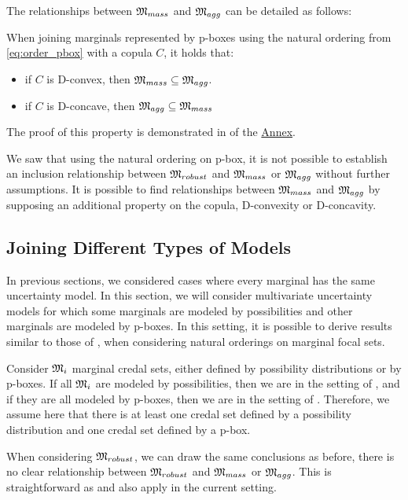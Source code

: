 The relationships between $\mathfrak{M}_{mass}$ and $\mathfrak{M}_{agg}$ can be detailed as follows:
\begin{proposition}\label{prop:convexity_pbox}
    When joining marginals represented by p-boxes using the natural ordering from \eqref{eq:order_pbox} with a copula $C$, it holds that:
    \begin{itemize}
        \item if $C$ is D-convex, then $\mathfrak{M}_{mass}\subseteq \mathfrak{M}_{agg}$.
        \item if $C$ is D-concave, then $\mathfrak{M}_{agg}\subseteq\mathfrak{M}_{mass}$ 
    \end{itemize}
\end{proposition}
The proof of this property is demonstrated in  of the \hyperref[chap:annex]{Annex}.

We saw that using the natural ordering on p-box, it is not possible to establish an inclusion relationship between $\mathfrak{M}_{robust}$ and $\mathfrak{M}_{mass}$ or $\mathfrak{M}_{agg}$ without further assumptions. It is possible to find relationships between $\mathfrak{M}_{mass}$ and $\mathfrak{M}_{agg}$ by supposing an additional property on the copula, \ie D-convexity or D-concavity.

\subsection{Joining Different Types of Models}\label{subsec:multiple_models}
In previous sections, we considered cases where every marginal has the same uncertainty model. In this section, we will consider multivariate uncertainty models for which some marginals are modeled by possibilities and other marginals are modeled by p-boxes. In this setting, it is possible to derive results similar to those of , when considering natural orderings on marginal focal sets. 

Consider $\mathfrak{M}_i$ marginal credal sets, either defined by possibility distributions or by p-boxes. If all $\mathfrak{M}_i$ are modeled by possibilities, then we are in the setting of , and if they are all modeled by p-boxes, then we are in the setting of . Therefore, we assume here that there is at least one credal set defined by a possibility distribution and one credal set defined by a p-box. 

When considering $\mathfrak{M}_{robust}$, we can draw the same conclusions as before, \ie there is no clear relationship between $\mathfrak{M}_{robust}$ and $\mathfrak{M}_{mass}$ or $\mathfrak{M}_{agg}$. This is straightforward as  and  also apply in the current setting.

